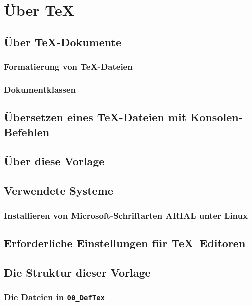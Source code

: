 \chapter					{Über \TeX}														
	\section				{Über \TeX -Dokumente}
		\subsection 		{Formatierung von \TeX -Dateien}								
		\subsection 		{Dokumentklassen}												
	\section				{Übersetzen eines \TeX -Dateien mit Konsolen-Befehlen}			
	\section				{Über diese Vorlage}
	\section				{Verwendete Systeme}											
		\subsection 		{Installieren von Microsoft-Schriftarten ARIAL unter Linux}		
	\section				{Erforderliche Einstellungen für \TeX ~Editoren}				
	\section				{Die Struktur dieser Vorlage}									
		\subsection			{Die Dateien in \texttt{00\_DefTex}}							
\newpage
